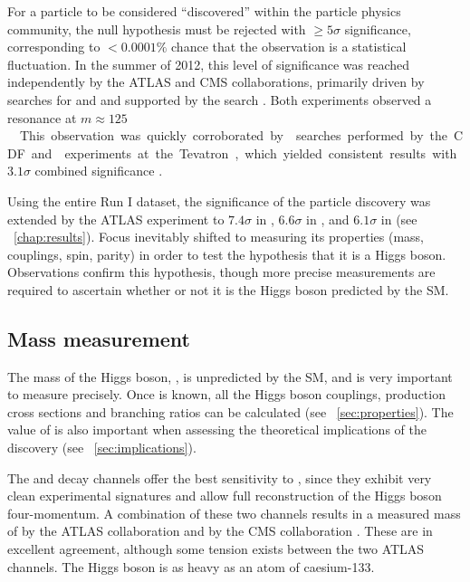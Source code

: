 
For a particle to be considered ``discovered'' within the particle physics community, 
the null hypothesis must be rejected with $\geq\!5\sigma$ significance, 
corresponding to $<0.0001\%$ chance that the observation is a statistical fluctuation.
In the summer of 2012, this level of significance was reached independently by the ATLAS 
and CMS collaborations, primarily driven by searches for \HepProcess{\PHiggs \HepTo 
\Pphoton\Pphoton} and \HepProcess{\PHiggs \HepTo \PZ\PZ} and supported by the \HWW search 
\cite{ATLAS-discovery,CMS-discovery}. Both experiments observed a resonance at 
\unit{$m \approx 125$}{\GeV}.

This observation was quickly corroborated by \HepProcess{\PV\PHiggs \HepTo 
\PV\Pbottom\APbottom} searches performed by the CDF and \dzero experiments at the Tevatron, 
which yielded consistent results with $3.1\sigma$ combined significance 
\cite{Tevatron:2012}.

Using the entire Run I dataset, the significance of the particle discovery was extended 
by the ATLAS experiment to $7.4\sigma$ in \HepProcess{\PHiggs \HepTo \Pphoton\Pphoton} 
\cite{ATLAS:combination:2013}, $6.6\sigma$ in \HepProcess{\PHiggs \HepTo \PZ\PZ} 
\cite{ATLAS:combination:2013}, and $6.1\sigma$ in \HWW (see 
\Chapter~\ref{chap:results}). Focus inevitably shifted to measuring its properties (mass, 
couplings, spin, parity) in order to test the hypothesis that it is a Higgs boson.
Observations confirm this hypothesis, though more precise measurements are required to 
ascertain whether or not it is the Higgs boson predicted by the SM.



\subsection{Mass measurement}
\label{sec:searches:mass}

The mass of the Higgs boson, \mH, is unpredicted by the SM, and is very important to 
measure precisely. Once \mH is known, all the Higgs boson couplings, production cross 
sections and branching ratios can be calculated (see \Section~\ref{sec:properties}). The 
value of \mH is also important when assessing the theoretical implications of the 
discovery (see \Section~\ref{sec:implications}).

The \HepProcess{\PHiggs \HepTo \Pphoton\Pphoton} and \HepProcess{\PHiggs \HepTo \PZ\PZ} 
decay channels offer the best sensitivity to \mH, since they exhibit very clean 
experimental signatures and allow full reconstruction of the Higgs boson four-momentum.
A combination of these two channels results in a measured mass of 
\unit{}{\GeV} by the ATLAS collaboration \cite{ATLAS:mass} 
and \unit{}{\GeV} by the CMS collaboration \cite{CMS:mass}. 
These are in excellent agreement, although some tension exists between the two ATLAS 
channels. The Higgs boson is as heavy as an atom of caesium-133.

